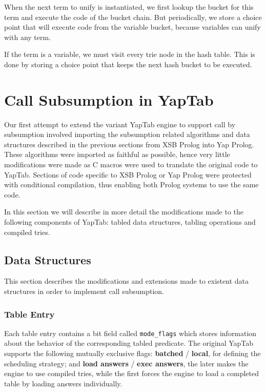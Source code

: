 When the next term to unify is instantiated, we first lookup the bucket for this
term and execute the code of the bucket chain. But periodically, we store a choice point that will
execute code from the variable bucket, because variables can unify with any term.

If the term is a variable, we must visit every trie node in the hash table. This is done
by storing a choice point that keeps the next hash bucket to be executed.

\section{Call Subsumption in YapTab}

Our first attempt to extend the variant YapTab engine to support call by subsumption
involved importing the subsumption related algorithms and data structures described in
the previous sections from XSB Prolog into Yap Prolog. These algorithms were imported as faithful as possible,
hence very little modifications were made as C macros were used to translate the original
code to YapTab. Sections of code specific to XSB Prolog or Yap Prolog were protected with conditional
compilation, thus enabling both Prolog systems to use the same code.

In this section we will describe in more detail the modifications made to the following components of YapTab:
tabled data structures, tabling operations and compiled tries.

\subsection{Data Structures}

This section describes the modifications and extensions made to existent data structures
in order to implement call subsumption.

\subsubsection{Table Entry}

Each table entry contains a bit field called \texttt{mode\_flags} which stores information about
the behavior of the corresponding tabled predicate. The original YapTab supports the
following mutually exclusive flags: \textbf{batched} / \textbf{local}, for defining the scheduling strategy;
and \textbf{load answers} / \textbf{exec answers}, the later makes the engine to use compiled tries,
while the first forces the engine to load a completed table by loading answers individually.

